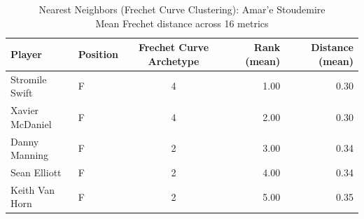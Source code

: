 \begin{table}[t]
\caption*{
{\fontsize{20}{25} Nearest Neighbors (Frechet Curve Clustering): Amar'e Stoudemire\fontsize{12}{15}\selectfont } \\ 
{\fontsize{14}{17}\selectfont  Mean Frechet distance across 16 metrics\fontsize{12}{15}\selectfont }
} 
\fontsize{12.0pt}{14.0pt}\selectfont
\begin{tabular*}{\linewidth}{@{\extracolsep{\fill}}llcrr}
\toprule
Player & Position & Frechet Curve Archetype & Rank (mean) & Distance (mean) \\ 
\midrule\addlinespace[2.5pt]
Stromile Swift & F & 4 & 1.00 & 0.30 \\ 
Xavier McDaniel & F & 4 & 2.00 & 0.30 \\ 
Danny Manning & F & 2 & 3.00 & 0.34 \\ 
Sean Elliott & F & 2 & 4.00 & 0.34 \\ 
Keith Van Horn & F & 2 & 5.00 & 0.35 \\ 
\bottomrule
\end{tabular*}
\end{table}

